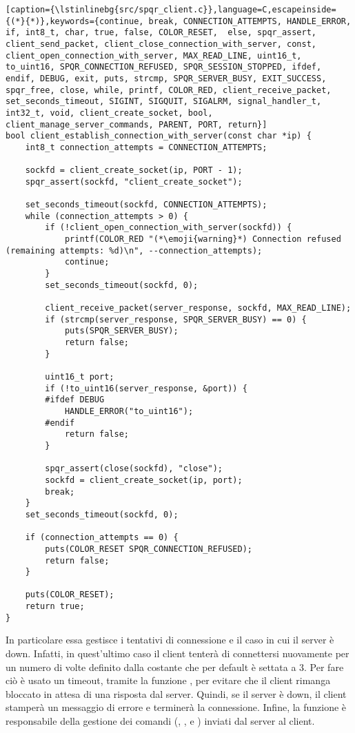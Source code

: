 \begin{lstlisting}[caption={\lstinlinebg{src/spqr_client.c}},language=C,escapeinside={(*}{*)},keywords={continue, break, CONNECTION_ATTEMPTS, HANDLE_ERROR, if, int8_t, char, true, false, COLOR_RESET,  else, spqr_assert, client_send_packet, client_close_connection_with_server, const, client_open_connection_with_server, MAX_READ_LINE, uint16_t, to_uint16, SPQR_CONNECTION_REFUSED, SPQR_SESSION_STOPPED, ifdef, endif, DEBUG, exit, puts, strcmp, SPQR_SERVER_BUSY, EXIT_SUCCESS, spqr_free, close, while, printf, COLOR_RED, client_receive_packet, set_seconds_timeout, SIGINT, SIGQUIT, SIGALRM, signal_handler_t, int32_t, void, client_create_socket, bool, client_manage_server_commands, PARENT, PORT, return}]
bool client_establish_connection_with_server(const char *ip) {
    int8_t connection_attempts = CONNECTION_ATTEMPTS;

    sockfd = client_create_socket(ip, PORT - 1);
    spqr_assert(sockfd, "client_create_socket");

    set_seconds_timeout(sockfd, CONNECTION_ATTEMPTS);
    while (connection_attempts > 0) {
        if (!client_open_connection_with_server(sockfd)) {
            printf(COLOR_RED "(*\emoji{warning}*) Connection refused (remaining attempts: %d)\n", --connection_attempts);
            continue;
        }
        set_seconds_timeout(sockfd, 0);
        
        client_receive_packet(server_response, sockfd, MAX_READ_LINE);
        if (strcmp(server_response, SPQR_SERVER_BUSY) == 0) {
            puts(SPQR_SERVER_BUSY);
            return false;
        }

        uint16_t port;
        if (!to_uint16(server_response, &port)) {
        #ifdef DEBUG
            HANDLE_ERROR("to_uint16");
        #endif
            return false;
        }
        
        spqr_assert(close(sockfd), "close");
        sockfd = client_create_socket(ip, port);
        break;
    }
    set_seconds_timeout(sockfd, 0);

    if (connection_attempts == 0) {
        puts(COLOR_RESET SPQR_CONNECTION_REFUSED);
        return false;
    }

    puts(COLOR_RESET);
    return true;
}
\end{lstlisting}

In particolare essa gestisce i tentativi di connessione e il caso in cui il server è down.
Infatti, in quest'ultimo caso il client tenterà di connettersi nuovamente per un numero di volte definito dalla costante  che per default è settata a $3$.
Per fare ciò è usato un timeout, tramite la funzione , per evitare che il client rimanga bloccato in attesa di una risposta dal server.
Quindi, se il server è down, il client stamperà un messaggio di errore e terminerà la connessione.
Infine, la funzione  è responsabile della gestione dei comandi (, ,  e ) inviati dal server al client.

